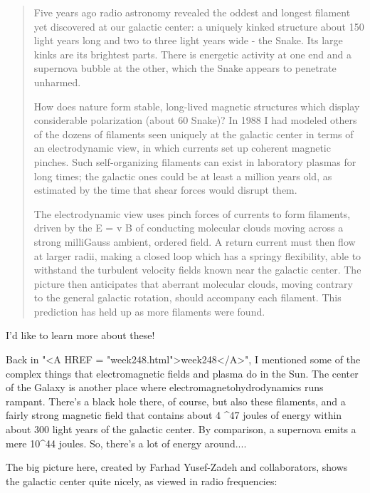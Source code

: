 \begin{quote}
   Five years ago radio astronomy revealed the oddest and longest 
   filament yet discovered at our galactic center: a uniquely kinked 
   structure about 150 light years long and two to three light years 
   wide - the Snake.  Its large kinks are its brightest parts.  There 
   is energetic activity at one end and a supernova bubble at the other, 
   which the Snake appears to penetrate unharmed.

   How does nature form stable, long-lived magnetic structures which 
   display considerable polarization (about 60%
   Snake)?  In 1988 I had modeled others of the dozens of filaments 
   seen uniquely at the galactic center in terms of an electrodynamic 
   view, in which currents set up coherent magnetic pinches.  Such 
   self-organizing filaments can exist in laboratory plasmas for long 
   times; the galactic ones could be at least a million years old, as 
   estimated by the time that shear forces would disrupt them.

   The electrodynamic view uses pinch forces of currents to form filaments, 
   driven by the E = v \times  B of conducting molecular clouds moving across a 
   strong milliGauss ambient, ordered field.  A return current must then 
   flow at larger radii, making a closed loop which has a springy 
   flexibility, able to withstand the turbulent velocity fields known 
   near the galactic center.  The picture then anticipates that aberrant 
   molecular clouds, moving contrary to the general galactic rotation, 
   should accompany each filament.  This prediction has held up as more 
   filaments were found. 
\end{quote}

I'd like to learn more about these!  

Back in "<A HREF = "week248.html">week248</A>", I mentioned some of the complex things that 
electromagnetic fields and plasma do in the Sun.  The center of the
Galaxy is another place where electromagnetohydrodynamics runs 
rampant.  There's a black hole there, of course, but also these
filaments, and a fairly strong magnetic field that contains about 
4 ^{47} joules of energy within about 300 light years of the 
galactic center.  By comparison, a supernova emits a mere 10^{44} 
joules.  So, there's a lot of energy around....

The big picture here, created by Farhad Yusef-Zadeh and collaborators, 
shows the galactic center quite nicely, as viewed in radio frequencies:

